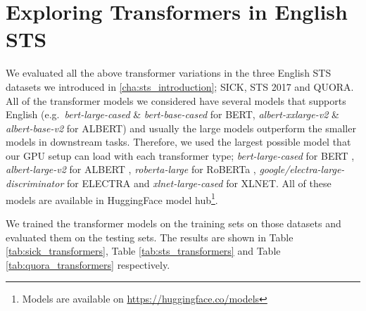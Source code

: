 \section{Exploring Transformers in English STS}
We evaluated all the above transformer variations in the three English STS datasets we introduced in \ref{cha:sts_introduction}; SICK, STS 2017 and QUORA. All of the transformer models we considered have several models that supports English (e.g.\ \textit{bert-large-cased} \& \textit{bert-base-cased} for BERT, \textit{albert-xxlarge-v2} \& \textit{albert-base-v2} for ALBERT) and usually the large models outperform the smaller models in downstream tasks. Therefore, we used the largest possible model that our GPU setup can load with each transformer type; \textit{bert-large-cased} for BERT \cite{devlin-etal-2019-bert}, \textit{albert-large-v2} for ALBERT \cite{Lan2020ALBERT}, \textit{roberta-large} for RoBERTa \cite{liu2019roberta}, \textit{google/electra-large-discriminator} for ELECTRA \cite{Clark2020ELECTRA} and \textit{xlnet-large-cased}  \cite{yang2019xlnet} for XLNET. All of these models are available in HuggingFace \cite{wolf-etal-2020-transformers} model hub\footnote{Models are available on \url{https://huggingface.co/models}}.

We trained the transformer models on the training sets on those datasets and evaluated them on the testing sets. The results are shown in Table \ref{tab:sick_transformers}, Table \ref{tab:sts_transformers} and Table \ref{tab:quora_transformers} respectively. 

\begin{table}[htb]
	\centering
	\caption[Results for SICK with Transformer Models]{Results for SICK dataset with different variants of transformer models. For each variant, Pearson Correlation ($\bm{\rho}$) and Spearman Correlation ($\bm{\tau}$) are reported between the predicted values and the gold labels of the test set. Best result from all the variations is marked with ${\dagger}$.}  
	\label{tab:sick_transformers}
\end{table}


